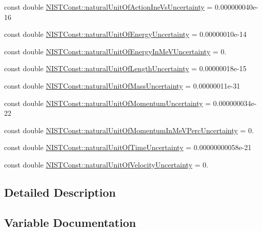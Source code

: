 \begin{DoxyCompactItemize}
\item 
const double \hyperlink{group___natural_unit_ga39a2d5e3b25421bb526912e6f464ae4d}{N\+I\+S\+T\+Const\+::natural\+Unit\+Of\+Action\+Ine\+Vs\+Uncertainty} = 0.\+000000040e-\/16
\item 
const double \hyperlink{group___natural_unit_ga9d15ef686c79c805b247d0db0807371a}{N\+I\+S\+T\+Const\+::natural\+Unit\+Of\+Energy\+Uncertainty} = 0.\+00000010e-\/14
\item 
const double \hyperlink{group___natural_unit_ga7669f513a9dbcb0eb24eca6f9de39f0f}{N\+I\+S\+T\+Const\+::natural\+Unit\+Of\+Energy\+In\+Me\+V\+Uncertainty} = 0.
\item 
const double \hyperlink{group___natural_unit_ga84c754daaf83019b7238e8ec133001a6}{N\+I\+S\+T\+Const\+::natural\+Unit\+Of\+Length\+Uncertainty} = 0.\+00000018e-\/15
\item 
const double \hyperlink{group___natural_unit_gabf96b874ece35b6b5ada8207d80bab73}{N\+I\+S\+T\+Const\+::natural\+Unit\+Of\+Mass\+Uncertainty} = 0.\+00000011e-\/31
\item 
const double \hyperlink{group___natural_unit_ga3a03830abcca1d155f419d616a5b15f0}{N\+I\+S\+T\+Const\+::natural\+Unit\+Of\+Momentum\+Uncertainty} = 0.\+000000034e-\/22
\item 
const double \hyperlink{group___natural_unit_ga50e4b860397c307791bc2786590f5291}{N\+I\+S\+T\+Const\+::natural\+Unit\+Of\+Momentum\+In\+Me\+V\+Perc\+Uncertainty} = 0.
\item 
const double \hyperlink{group___natural_unit_gabb48c3143ddc02570de65d6fe02a7c7b}{N\+I\+S\+T\+Const\+::natural\+Unit\+Of\+Time\+Uncertainty} = 0.\+00000000058e-\/21
\item 
const double \hyperlink{group___natural_unit_ga68827b9e5fea839db077836f3ace3aa5}{N\+I\+S\+T\+Const\+::natural\+Unit\+Of\+Velocity\+Uncertainty} = 0.
\end{DoxyCompactItemize}


\subsection{Detailed Description}


\subsection{Variable Documentation}
\mbox{\label{group___natural_unit_ga6470eede777c792729aeb594d11b1005}} 
